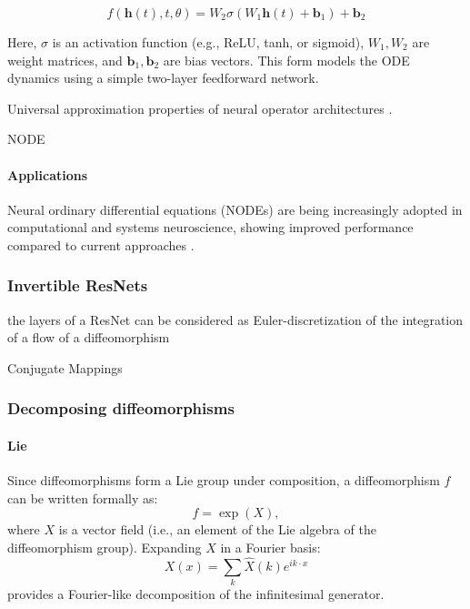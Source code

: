 \documentclass{article}
\theoremstyle{definition} \newtheorem{definition}{Definition}  \newtheorem{example}{Example}
\theoremstyle{remark} \newtheorem{remark}{Remark}
\newcounter{ct}
\begin{document}
\[
f(\mathbf{h}(t), t, \theta) = W_2 \sigma(W_1 \mathbf{h}(t) + \mathbf{b}_1) + \mathbf{b}_2
\]

Here, \( \sigma \) is an activation function (e.g., ReLU, tanh, or sigmoid), \( W_1, W_2 \) are weight matrices, and \( \mathbf{b}_1, \mathbf{b}_2 \) are bias vectors.
 This form models the ODE dynamics using a simple two-layer feedforward network.

Universal approximation properties of neural operator architectures \citep{lu2021learning, kissas2022learning, kovachki2021universal}.

NODE\citep{finlay2020trainnode}
\citep{torchdiffeq}


\paragraph{Applications}
Neural ordinary differential equations (NODEs) are being increasingly adopted in computational and systems neuroscience, showing improved performance compared to current approaches \citep{kim2021inferring,geenjaar2023learning,sedler2023expressive,elgazzar2024universal,rubanova2019latent,coelho2024enhancing}.



\subsubsection{Invertible ResNets}
the layers of a ResNet can be considered as Euler-discretization of the integration of a flow of a diffeomorphism\citep{rousseau2020residual}







Conjugate Mappings \citep{bramburger2021conjugate}


\subsubsection{Decomposing diffeomorphisms}\label{sec:diff_dec}
\paragraph{Lie}
Since diffeomorphisms form a Lie group under composition, a diffeomorphism 
\( f \) can be written formally as:
\[
f = \exp(X),
\]
where \( X \) is a vector field (i.e., an element of the Lie algebra of the diffeomorphism group). Expanding \( X \) in a Fourier basis:
\[
X(x) = \sum_k \hat{X}(k) e^{i k \cdot x}
\]
provides a Fourier-like decomposition of the infinitesimal generator.
\end{document}
